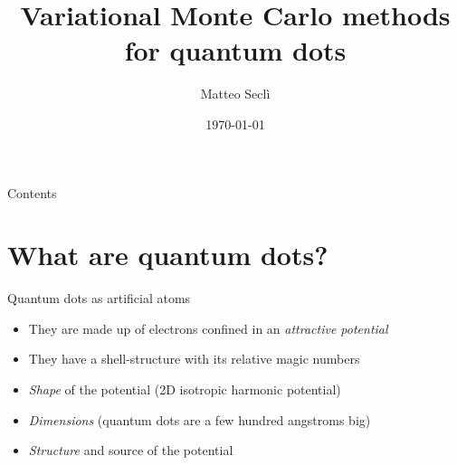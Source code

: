 \documentclass[10pt, compress, usetitleprogressbar, protectframetitle]{beamer}
\title{Variational Monte Carlo methods for quantum dots}
\subtitle{}
\date{\monthyear\today}
\author{Matteo Seclì}
\institute{\scshape University of Trento -- Department of Physics}
\begin{document}
\maketitle

\begin{frame}{Contents}
	\tableofcontents
\end{frame}

\section{What are quantum dots?}

\begin{frame}{Quantum dots as artificial atoms}

	
	
	
	\begin{itemize}[<+->]
		\item They are made up of electrons confined in an \emph{attractive potential}
		\item They have a shell-structure with its relative \alert{magic numbers}
	\end{itemize}

	
	\begin{itemize}[<+->]
		\item \emph{Shape} of the potential (2D isotropic harmonic potential)
		\item \emph{Dimensions} (quantum dots are a few hundred angstroms big)
		\item \emph{Structure} and source of the potential
	\end{itemize}
	
	
\end{frame}
\end{document}
